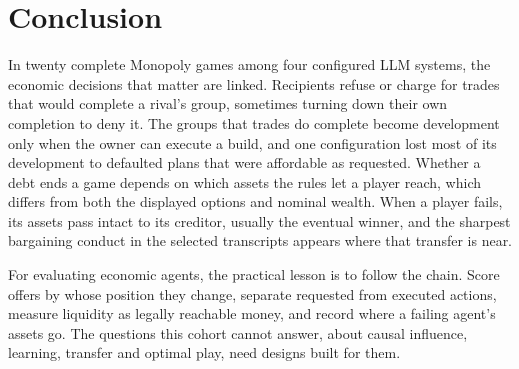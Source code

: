 \section{Conclusion}

In twenty complete Monopoly games among four configured LLM systems, the economic decisions that matter are linked. Recipients refuse or charge for trades that would complete a rival's group, sometimes turning down their own completion to deny it. The groups that trades do complete become development only when the owner can execute a build, and one configuration lost most of its development to defaulted plans that were affordable as requested. Whether a debt ends a game depends on which assets the rules let a player reach, which differs from both the displayed options and nominal wealth. When a player fails, its assets pass intact to its creditor, usually the eventual winner, and the sharpest bargaining conduct in the selected transcripts appears where that transfer is near.

For evaluating economic agents, the practical lesson is to follow the chain. Score offers by whose position they change, separate requested from executed actions, measure liquidity as legally reachable money, and record where a failing agent's assets go. The questions this cohort cannot answer, about causal influence, learning, transfer and optimal play, need designs built for them.
